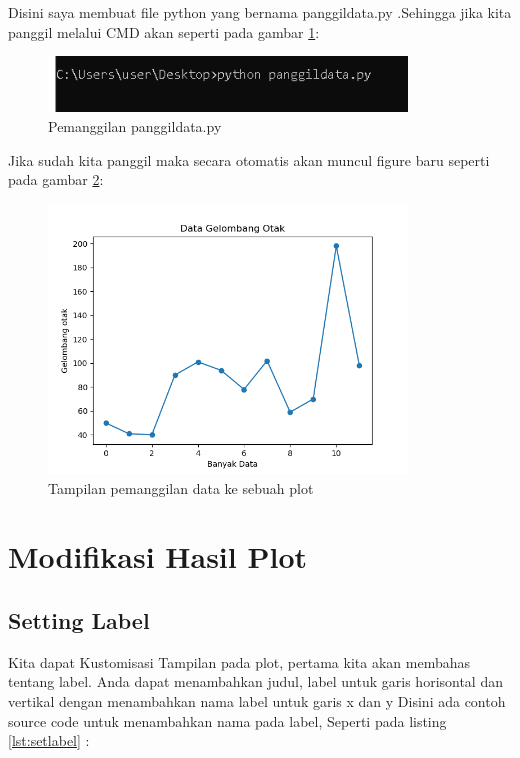 Disini saya membuat file python yang bernama panggildata.py .Sehingga jika kita panggil melalui CMD akan seperti pada gambar \ref{fig:panggildata}:
\begin{figure}[!htbp]
	\centerline{\includegraphics[width=0.85\textwidth]{figures/6/panggildata.PNG}}
	\caption{Pemanggilan panggildata.py}
	\label{fig:panggildata}
\end{figure}

Jika sudah kita panggil maka secara otomatis akan muncul figure baru seperti pada gambar \ref{fig:pplot}:
\begin{figure}[!htbp]
	\centerline{\includegraphics[width=0.85\textwidth]{figures/6/pplot.PNG}}
	\caption{Tampilan pemanggilan data ke sebuah plot}
	\label{fig:pplot}
\end{figure} 

\section{Modifikasi Hasil Plot} 
\subsection{Setting Label} 
Kita dapat Kustomisasi Tampilan pada plot, pertama kita akan membahas tentang label. Anda dapat menambahkan judul, label untuk garis horisontal dan vertikal dengan menambahkan nama label untuk garis x dan y
Disini ada contoh source code untuk menambahkan nama pada label, Seperti pada listing \ref{lst:setlabel} : 



